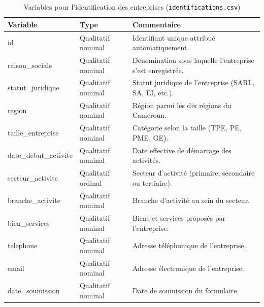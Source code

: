 \documentclass[12pt, a4paper, oneside]{report}
\begin{document}
\begin{table}[H]
  \centering
  \caption{Variables pour l'identification des entreprises (\texttt{identifications.csv})}
  \label{tab:var_identification}
  \renewcommand{\arraystretch}{1.5}
  \begin{tabularx}{\textwidth}{
      >{\ttfamily\raggedright\arraybackslash}p{3.8cm}
      >{\raggedright\arraybackslash}p{2.8cm}
      >{\raggedright\arraybackslash}X}

    \toprule
    \rowcolor{primary!15}
    \textbf{Variable} & \textbf{Type} & \textbf{Commentaire} \\
    \midrule

    id & Qualitatif nominal & Identifiant unique attribué automatiquement. \\
    \rowcolor{lightgray}
    raison\_sociale & Qualitatif nominal & Dénomination sous laquelle l'entreprise s'est enregistrée. \\
    statut\_juridique & Qualitatif nominal & Statut juridique de l'entreprise (SARL, SA, EI, etc.). \\
    \rowcolor{lightgray}
    region & Qualitatif nominal & Région parmi les dix régions du Cameroun. \\
    taille\_entreprise & Qualitatif nominal & Catégorie selon la taille (TPE, PE, PME, GE). \\
    \rowcolor{lightgray}
    date\_debut\_activite & Qualitatif nominal & Date effective de démarrage des activités. \\
    secteur\_activite & Qualitatif ordinal & Secteur d'activité (primaire, secondaire ou tertiaire). \\
    \rowcolor{lightgray}
    branche\_activite & Qualitatif nominal & Branche d'activité au sein du secteur. \\
    bien\_services & Qualitatif nominal & Biens et services proposés par l'entreprise. \\
    \rowcolor{lightgray}
    telephone & Qualitatif nominal & Adresse téléphonique de l'entreprise. \\
    email & Qualitatif nominal & Adresse électronique de l'entreprise. \\
    \rowcolor{lightgray}
    date\_soumission & Qualitatif nominal & Date de soumission du formulaire. \\

    \bottomrule
  \end{tabularx}
\end{table}
\end{document}
